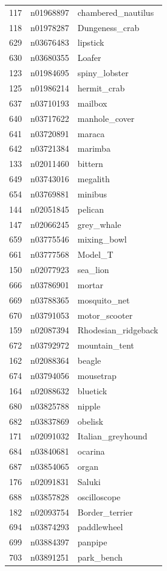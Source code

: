 \begin{table}
\begin{tabular}{cll}
117 & n01968897 & chambered_nautilus \\
118 & n01978287 & Dungeness_crab \\
629 & n03676483 & lipstick \\
630 & n03680355 & Loafer \\
123 & n01984695 & spiny_lobster \\
125 & n01986214 & hermit_crab \\
637 & n03710193 & mailbox \\
640 & n03717622 & manhole_cover \\
641 & n03720891 & maraca \\
642 & n03721384 & marimba \\
133 & n02011460 & bittern \\
649 & n03743016 & megalith \\
654 & n03769881 & minibus \\
144 & n02051845 & pelican \\
147 & n02066245 & grey_whale \\
659 & n03775546 & mixing_bowl \\
661 & n03777568 & Model_T \\
150 & n02077923 & sea_lion \\
666 & n03786901 & mortar \\
669 & n03788365 & mosquito_net \\
670 & n03791053 & motor_scooter \\
159 & n02087394 & Rhodesian_ridgeback \\
672 & n03792972 & mountain_tent \\
162 & n02088364 & beagle \\
674 & n03794056 & mousetrap \\
164 & n02088632 & bluetick \\
680 & n03825788 & nipple \\
682 & n03837869 & obelisk \\
171 & n02091032 & Italian_greyhound \\
684 & n03840681 & ocarina \\
687 & n03854065 & organ \\
176 & n02091831 & Saluki \\
688 & n03857828 & oscilloscope \\
182 & n02093754 & Border_terrier \\
694 & n03874293 & paddlewheel \\
699 & n03884397 & panpipe \\
703 & n03891251 & park_bench \\

\end{tabular}
\end{table}
